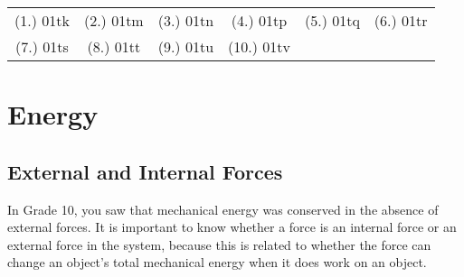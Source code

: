 {%
\par \practiceinfo
\par \begin{tabular}[h]{cccccc}
(1.)	01tk	&
(2.)	01tm	&
(3.)	01tn	&
(4.)	01tp	&
(5.)	01tq	&
(6.)	01tr	\\ %
(7.)	01ts	&
(8.)	01tt	&
(9.)	01tu	&
(10.)	01tv	&
\end{tabular}

}

\section{Energy}

\subsection{External and Internal Forces}
In Grade 10, you saw that mechanical energy was conserved in the absence of external forces. It is important to know whether a force is an internal force or an external force in the system, because this is related to whether the force can change an object's total mechanical energy when it does work on an object. 

